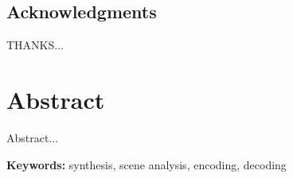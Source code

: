 \documentclass[a4paper,11pt,twoside]{ThesisStyle}
\begin{document}

\dominitoc
{}
 \cleardoublepage
\section*{Acknowledgments}
THANKS...

\tableofcontents
\mainmatter

\cleardoublepage
\chapter*{Abstract}
Abstract... 

{\large\textbf{Keywords:}}
synthesis, scene analysis, encoding, decoding







\appendix



\end{document}
